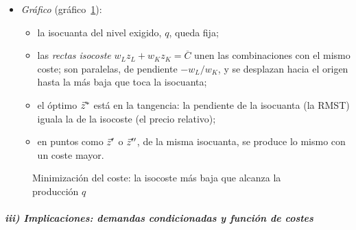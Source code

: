 \documentclass[11pt]{article}
\begin{document}
\begin{itemize}
\begin{itemize}
\begin{equation*}
    \end{equation*}
    debe cumplir $|\overline{H}|>0$ en el óptimo, lo que equivale a isocuantas estrictamente convexas en ese punto; con $F$ estrictamente cuasicóncava se cumple y la solución es única. Es la misma condición que en el problema del consumidor (anexo~\ref{anexo:kt}).
  \end{itemize}
\item \emph{Gráfico} (gráfico~\ref{fig:mc}):
  \begin{itemize}
  \item la isocuanta del nivel exigido, $q$, queda fija;
  \item las \emph{rectas isocoste} $w_Lz_L+w_Kz_K=\overline{C}$ unen las combinaciones con el mismo coste; son paralelas, de pendiente $-w_L/w_K$, y se desplazan hacia el origen hasta la más baja que toca la isocuanta;
  \item el óptimo $\vec{z}^*$ está en la tangencia: la pendiente de la isocuanta (la RMST) iguala la de la isocoste (el precio relativo);
  \item en puntos como $\vec{z}'$ o $\vec{z}''$, de la misma isocuanta, se produce lo mismo con un coste mayor.
  \end{itemize}
\end{itemize}

\begin{figure}[H]
\centering
\caption{Minimización del coste: la isocoste más baja que alcanza la producción $q$}\label{fig:mc}
\end{figure}

\subparagraph{iii) Implicaciones: demandas condicionadas y función de costes}
\end{document}
